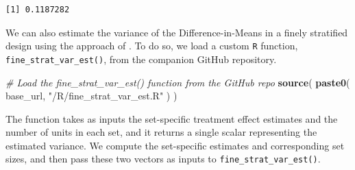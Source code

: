 \documentclass[
  12pt,
  leqno]{article}
\newenvironment{Shaded}{\begin{snugshade}}{\end{snugshade}}
\newcommand{\AttributeTok}[1]{\textcolor[rgb]{0.13,0.29,0.53}{#1}}
\newcommand{\CommentTok}[1]{\textcolor[rgb]{0.56,0.35,0.01}{\textit{#1}}}
\newcommand{\DataTypeTok}[1]{\textcolor[rgb]{0.13,0.29,0.53}{#1}}
\newcommand{\DecValTok}[1]{\textcolor[rgb]{0.00,0.00,0.81}{#1}}
\newcommand{\FunctionTok}[1]{\textcolor[rgb]{0.13,0.29,0.53}{\textbf{#1}}}
\newcommand{\NormalTok}[1]{#1}
\newcommand{\OtherTok}[1]{\textcolor[rgb]{0.56,0.35,0.01}{#1}}
\newcommand{\SpecialCharTok}[1]{\textcolor[rgb]{0.81,0.36,0.00}{\textbf{#1}}}
\newcommand{\StringTok}[1]{\textcolor[rgb]{0.31,0.60,0.02}{#1}}
\begin{document}
\begin{verbatim}
[1] 0.1187282
\end{verbatim}

\doublespacing

We can also estimate the variance of the Difference-in-Means in a finely
stratified design using the approach of \citet{fogarty2018}. To do so,
we load a custom \texttt{R} function, \texttt{fine\_strat\_var\_est()},
from the companion GitHub repository.

\singlespacing

\begin{Shaded}
\begin{Highlighting}[]
\CommentTok{\# Load the fine\_strat\_var\_est() function from the GitHub repo}
\FunctionTok{source}\NormalTok{(}
  \FunctionTok{paste0}\NormalTok{(}
\NormalTok{    base\_url, }\StringTok{"/R/fine\_strat\_var\_est.R"}
\NormalTok{  )}
\NormalTok{)}
\end{Highlighting}
\end{Shaded}

\doublespacing

The function takes as inputs the set-specific treatment effect estimates
and the number of units in each set, and it returns a single scalar
representing the estimated variance. We compute the set-specific
estimates and corresponding set sizes, and then pass these two vectors
as inputs to \texttt{fine\_strat\_var\_est()}.

\singlespacing

\begin{Shaded}
\end{Shaded}
\end{document}
